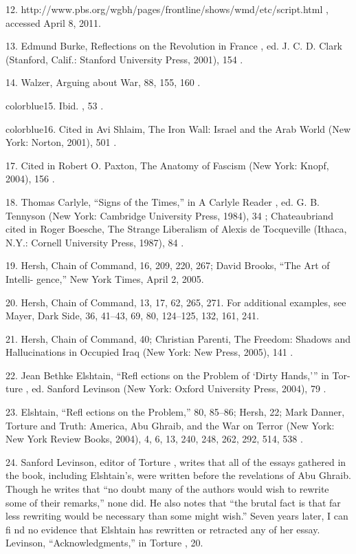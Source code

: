 	{\color{blue}12}. http://www.pbs.org/wgbh/pages/frontline/shows/wmd/etc/script.html , accessed April 8, 2011.


	{\color{blue}13}. Edmund Burke, Reflections on the Revolution in France , ed. J. C. D. Clark (Stanford, Calif.: Stanford University Press, 2001), 154 .


	{\color{blue}14}. Walzer, Arguing about War, 88, 155, 160 .


	{color{blue}15}. Ibid. , 53 .


	{color{blue}16}. Cited in Avi Shlaim, The Iron Wall: Israel and the Arab World (New York: Norton, 2001), 501 .


	{\color{blue}17}. Cited in Robert O. Paxton, The Anatomy of Fascism (New York: Knopf, 2004), 156 .


	{\color{blue}18}. Thomas Carlyle, “Signs of the Times,” in A Carlyle Reader , ed. G. B. Tennyson (New York: Cambridge University Press, 1984), 34 ; Chateaubriand cited in Roger Boesche, The Strange Liberalism of Alexis de Tocqueville (Ithaca, N.Y.: Cornell University Press, 1987), 84 .


	{\color{blue}19}. Hersh, Chain of Command, 16, 209, 220, 267; David Brooks, “The Art of Intelli- gence,” New York Times, April 2, 2005.


	{\color{blue}20}. Hersh, Chain of Command, 13, 17, 62, 265, 271. For additional examples, see Mayer, Dark Side, 36, 41–43, 69, 80, 124–125, 132, 161, 241.


	{\color{blue}21}. Hersh, Chain of Command, 40; Christian Parenti, The Freedom: Shadows and Hallucinations in Occupied Iraq (New York: New Press, 2005), 141 .


	{\color{blue}22}. Jean Bethke Elshtain, “Refl ections on the Problem of ‘Dirty Hands,’” in Tor- ture , ed. Sanford Levinson (New York: Oxford University Press, 2004), 79 .


	{\color{blue}23}. Elshtain, “Refl ections on the Problem,” 80, 85–86; Hersh, 22; Mark Danner, Torture and Truth: America, Abu Ghraib, and the War on Terror (New York: New York Review Books, 2004), 4, 6, 13, 240, 248, 262, 292, 514, 538 .


	{\color{blue}24}. Sanford Levinson, editor of Torture , writes that all of the essays gathered in the book, including Elshtain’s, were written before the revelations of Abu Ghraib. Though he writes that “no doubt many of the authors would wish to rewrite some of their remarks,” none did. He also notes that “the brutal fact is that far less rewriting would be necessary than some might wish.” Seven years later, I can fi nd no evidence that Elshtain has rewritten or retracted any of her essay. Levinson, “Acknowledgments,” in Torture , 20.


